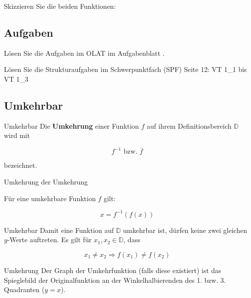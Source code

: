 Skizzieren Sie die beiden Funktionen:

\newpage


\subsection{Aufgaben}
Lösen Sie die Aufgaben im OLAT im Aufgabenblatt
.

Lösen Sie die Strukturaufgaben im Schwerpunktfach (SPF) Seite 12: VT
1\_1 bis VT 1\_3

\newpage


\subsection{Umkehrbar}
\begin{definition}{Umkehrbar}{}
Die \textbf{Umkehrung} einer Funktion $f$ auf ihrem Definitionsbereich
$\mathbb{D}$ wird mit

  $$f^{-1} \textrm{ bzw. } \bar{f}$$

bezeichnet.
\end{definition}

\begin{gesetz}{Umkehrung der Umkehrung}{}

  Für eine umkehrbare Funktion $f$ gilt:
  
  $$x= f^{-1}(f(x))$$
\end{gesetz}


\begin{gesetz}{Umkehrbar}{}
  Damit eine Funktion auf $\mathbb{D}$ umkehrbar ist, dürfen keine zwei
  gleichen $y$-Werte auftreten. Es gilt für $x_1,x_2\in\mathbb{D}$,
  dass
  
  $$x_1\ne x_2 \Longrightarrow f(x_1) \ne f(x_2)$$
\end{gesetz}

\begin{bemerkung}{Umkehrung}{}
 Der Graph der Umkehrfunktion (falls diese existiert) ist das
 Spieglebild der Originalfunktion 
 an der Winkelhalbierenden des 1. bzw. 3. Quadranten ($y=x$).
\end{bemerkung}
\newpage


